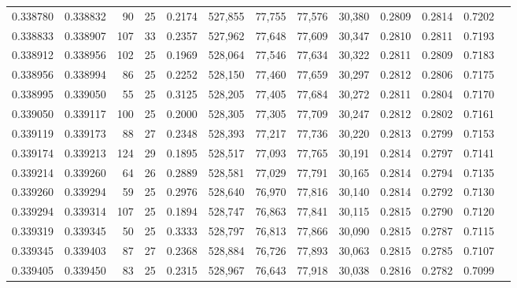 \begin{tabular}{rrrrrrrrrrrrr}
0.338780 & 0.338832 &    90 &  25 &                                     0.2174 & 527,855 &  77,755 &  77,576 &  30,380 & 0.2809 & 0.2814 & 0.7202 \\
0.338833 & 0.338907 &   107 &  33 &                                     0.2357 & 527,962 &  77,648 &  77,609 &  30,347 & 0.2810 & 0.2811 & 0.7193 \\
0.338912 & 0.338956 &   102 &  25 &                                     0.1969 & 528,064 &  77,546 &  77,634 &  30,322 & 0.2811 & 0.2809 & 0.7183 \\
0.338956 & 0.338994 &    86 &  25 &                                     0.2252 & 528,150 &  77,460 &  77,659 &  30,297 & 0.2812 & 0.2806 & 0.7175 \\
0.338995 & 0.339050 &    55 &  25 &                                     0.3125 & 528,205 &  77,405 &  77,684 &  30,272 & 0.2811 & 0.2804 & 0.7170 \\
0.339050 & 0.339117 &   100 &  25 &                                     0.2000 & 528,305 &  77,305 &  77,709 &  30,247 & 0.2812 & 0.2802 & 0.7161 \\
0.339119 & 0.339173 &    88 &  27 &                                     0.2348 & 528,393 &  77,217 &  77,736 &  30,220 & 0.2813 & 0.2799 & 0.7153 \\
0.339174 & 0.339213 &   124 &  29 &                                     0.1895 & 528,517 &  77,093 &  77,765 &  30,191 & 0.2814 & 0.2797 & 0.7141 \\
0.339214 & 0.339260 &    64 &  26 &                                     0.2889 & 528,581 &  77,029 &  77,791 &  30,165 & 0.2814 & 0.2794 & 0.7135 \\
0.339260 & 0.339294 &    59 &  25 &                                     0.2976 & 528,640 &  76,970 &  77,816 &  30,140 & 0.2814 & 0.2792 & 0.7130 \\
0.339294 & 0.339314 &   107 &  25 &                                     0.1894 & 528,747 &  76,863 &  77,841 &  30,115 & 0.2815 & 0.2790 & 0.7120 \\
0.339319 & 0.339345 &    50 &  25 &                                     0.3333 & 528,797 &  76,813 &  77,866 &  30,090 & 0.2815 & 0.2787 & 0.7115 \\
0.339345 & 0.339403 &    87 &  27 &                                     0.2368 & 528,884 &  76,726 &  77,893 &  30,063 & 0.2815 & 0.2785 & 0.7107 \\
0.339405 & 0.339450 &    83 &  25 &                                     0.2315 & 528,967 &  76,643 &  77,918 &  30,038 & 0.2816 & 0.2782 & 0.7099 \\

\end{tabular}
